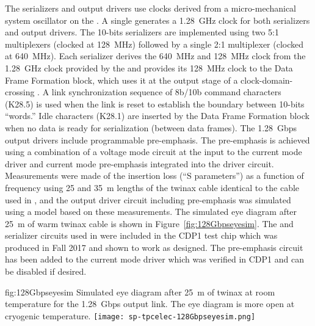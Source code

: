 The serializers and output drivers use clocks derived from a micro-mechanical
system oscillator on the . A single  generates a 
\SI{1.28}{GHz} clock for both serializers and output drivers. The 10-bits 
serializers are implemented using two 5:1 multiplexers (clocked at \SI{128}{MHz}) 
followed by a single 2:1 multiplexer (clocked at \SI{640}{MHz}). Each serializer 
derives the \SI{640}{MHz} and \SI{128}{MHz} clock from the \SI{1.28}{GHz} 
clock provided by the  and provides its \SI{128}{MHz} clock to 
the Data Frame Formation block, which uses it at the output stage of a 
clock-domain-crossing . A link synchronization sequence of 8b/10b 
command characters (K28.5) is used when the link is reset to establish the 
boundary between 10-bits ``words.'' Idle characters (K28.1) are inserted 
by the Data Frame Formation block when no data is ready for serialization 
(between data frames). The \SI{1.28}{Gbps} output drivers include programmable 
pre-emphasis. The pre-emphasis is achieved using a combination of a voltage 
mode circuit at the input to the current mode driver and current mode 
pre-emphasis integrated into the driver circuit. Measurements were made 
of the insertion loss (``S parameters'') as a function of frequency using
\num{25} and \SI{35}{m} lengths of the twinax cable identical to the 
cable used in , and the output driver circuit including 
pre-emphasis was simulated using a  model based on these 
measurements. The simulated eye diagram after \SI{25}{m} of warm twinax 
cable is shown in Figure~\ref{fig:128Gbpseyesim}. The  and 
serializer circuits used in  were included in the CDP1 
test chip which was produced in Fall 2017 and shown to work as designed. 
The pre-emphasis circuit has been added to the current mode driver which 
was verified in CDP1 and can be disabled if desired. 

\begin{dunefigure}
{fig:128Gbpseyesim}
{Simulated eye diagram after \SI{25}{m} of  twinax at room 
temperature for the  \SI{1.28}{Gbps} output link.  
The eye diagram is more open at cryogenic temperature.}
\texttt{[image: sp-tpcelec-128Gbpseyesim.png]}
\end{dunefigure}


